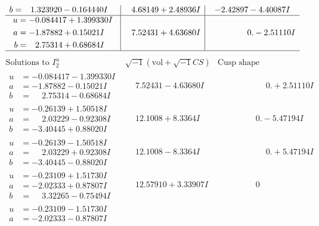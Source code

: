 \documentclass[1p]{elsarticle_modified}
\theoremstyle{definition}
\newcommand{\I}{\sqrt{-1}}
\begin{document}
$$\begin{array}{c|c|c}
\begin{aligned}
b &= \phantom{-}1.323920 - 0.164440 I\end{aligned}
 & \phantom{-}4.68149 + 2.48936 I & -2.42897 - 4.40087 I \\ \hline\begin{aligned}
u &= -0.084417 + 1.399330 I \\
a &= -1.87882 + 0.15021 I \\
b &= \phantom{-}2.75314 + 0.68684 I\end{aligned}
 & \phantom{-}7.52431 + 4.63680 I & \phantom{-0.000000 } 0. - 2.51110 I\\
 \hline 
 \end{array}$$\newpage$$\begin{array}{c|c|c}  
\text{Solutions to }I^u_{2}& \I (\text{vol} + \sqrt{-1}CS) & \text{Cusp shape}\\
 \hline 
\begin{aligned}
u &= -0.084417 - 1.399330 I \\
a &= -1.87882 - 0.15021 I \\
b &= \phantom{-}2.75314 - 0.68684 I\end{aligned}
 & \phantom{-}7.52431 - 4.63680 I & \phantom{-0.000000 -}0. + 2.51110 I \\ \hline\begin{aligned}
u &= -0.26139 + 1.50518 I \\
a &= \phantom{-}2.03229 - 0.92308 I \\
b &= -3.40445 + 0.88020 I\end{aligned}
 & \phantom{-}12.1008 + 8.3364 I & \phantom{-0.000000 } 0. - 5.47194 I \\ \hline\begin{aligned}
u &= -0.26139 - 1.50518 I \\
a &= \phantom{-}2.03229 + 0.92308 I \\
b &= -3.40445 - 0.88020 I\end{aligned}
 & \phantom{-}12.1008 - 8.3364 I & \phantom{-0.000000 -}0. + 5.47194 I \\ \hline\begin{aligned}
u &= -0.23109 + 1.51730 I \\
a &= -2.02333 + 0.87807 I \\
b &= \phantom{-}3.32265 - 0.75494 I\end{aligned}
 & \phantom{-}12.57910 + 3.33907 I & \phantom{-0.000000 } 0 \\ \hline\begin{aligned}
u &= -0.23109 - 1.51730 I \\
a &= -2.02333 - 0.87807 I \\

\end{aligned}
\end{array}$$
\end{document}
